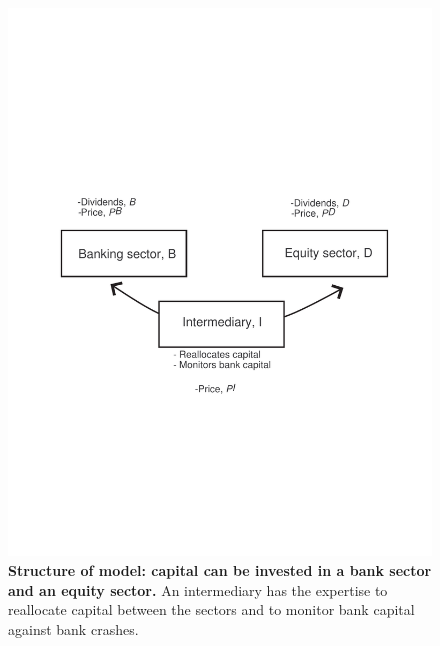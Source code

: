 \documentclass[11pt]{article}
\begin{document}
\clearpage


\begin{doublespacing}   %


\end{doublespacing}

\clearpage

\renewcommand{\enotesize}{\normalsize}
\begin{doublespacing}
  \theendnotes
\end{doublespacing}

\clearpage

\ 
\vfill
\begin{figure}[!htb]
\centerline{\includegraphics[width=7in]{Figure1}}
  \caption{{\bf Structure of model: capital can be invested in a bank sector and an equity sector.} An intermediary has the expertise to reallocate capital between the sectors and to monitor bank capital against bank crashes.} \label{fig:0}
\end{figure}
\vfill
\ 


\end{document}
